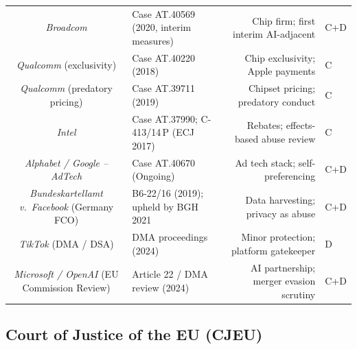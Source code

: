 \documentclass[12pt, letterpaper]{article}
\begin{document}
\begin{longtable}{@{}CIDT@{}}
\textit{Broadcom}
  & Case AT.40569 (2020, interim measures)
  & Chip firm; first interim AI-adjacent
  & C+D \\[4pt]

\textit{Qualcomm} (exclusivity)
  & Case AT.40220 (2018)
  & Chip exclusivity; Apple payments
  & C \\[4pt]

\textit{Qualcomm} (predatory pricing)
  & Case AT.39711 (2019)
  & Chipset pricing; predatory conduct
  & C \\[4pt]

\textit{Intel}
  & Case AT.37990; C-413/14\,P (ECJ 2017)
  & Rebates; effects-based abuse review
  & C \\[4pt]

\textit{Alphabet / Google -- AdTech}
  & Case AT.40670 (Ongoing)
  & Ad tech stack; self-preferencing
  & C+D \\[4pt]

\textit{Bundeskartellamt v.\ Facebook} (Germany FCO)
  & B6-22/16 (2019); upheld by BGH 2021
  & Data harvesting; privacy as abuse
  & C+D \\[4pt]

\textit{TikTok} (DMA / DSA)
  & DMA proceedings (2024)
  & Minor protection; platform gatekeeper
  & D \\[4pt]

\textit{Microsoft / OpenAI} (EU Commission Review)
  & Article 22 / DMA review (2024)
  & AI partnership; merger evasion scrutiny
  & C+D \\

\end{longtable}

\subsection{Court of Justice of the EU (CJEU)}
\end{document}

